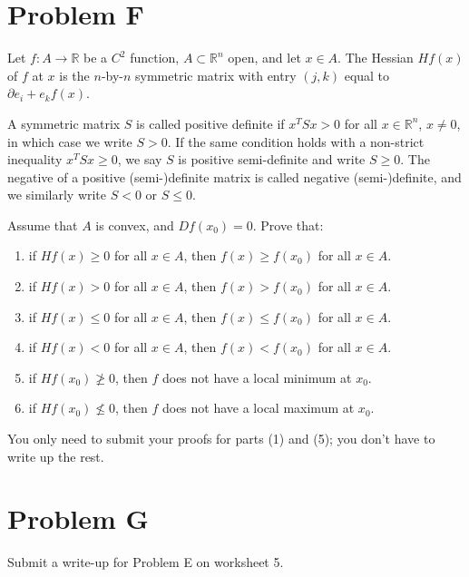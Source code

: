 \documentclass[lang=en,11pt]{template}
\begin{document}
\section*{Problem F}
Let $f : A \to \mathbb{R}$ be a $C^2$ function, $A \subset \mathbb{R}^n$ open, and let $x \in A$. The Hessian $Hf(x)$ of $f$ at $x$ is the $n$-by-$n$ symmetric matrix with entry $(j, k)$ equal to $\partial e_i + e_k f(x)$.

A symmetric matrix $S$ is called positive definite if $x^T S x > 0$ for all $x \in \mathbb{R}^n$, $x \neq 0$, in which case we write $S > 0$. If the same condition holds with a non-strict inequality $x^T S x \geq 0$, we say $S$ is positive semi-definite and write $S \geq 0$. The negative of a positive (semi-)definite matrix is called negative (semi-)definite, and we similarly write $S < 0$ or $S \leq 0$.

Assume that $A$ is convex, and $Df(x_0) = 0$. Prove that:
\begin{enumerate}
    \item if $Hf(x) \geq 0$ for all $x \in A$, then $f(x) \geq f(x_0)$ for all $x \in A$.
    \item if $Hf(x) > 0$ for all $x \in A$, then $f(x) > f(x_0)$ for all $x \in A$.
    \item if $Hf(x) \leq 0$ for all $x \in A$, then $f(x) \leq f(x_0)$ for all $x \in A$.
    \item if $Hf(x) < 0$ for all $x \in A$, then $f(x) < f(x_0)$ for all $x \in A$.
    \item if $Hf(x_0) \not\geq 0$, then $f$ does not have a local minimum at $x_0$.
    \item if $Hf(x_0) \not\leq 0$, then $f$ does not have a local maximum at $x_0$.
\end{enumerate}

You only need to submit your proofs for parts (1) and (5); you don’t have to write up the rest.

\section*{Problem G}
Submit a write-up for Problem E on worksheet 5.
\end{document}
